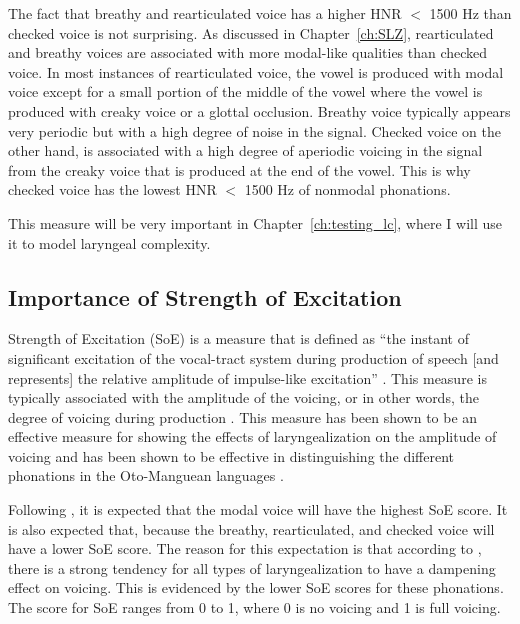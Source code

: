 The fact that breathy and rearticulated voice has a higher HNR $<$ 1500 Hz than checked voice is not surprising. As discussed in Chapter~\ref{ch:SLZ}, rearticulated and breathy voices are associated with more modal-like qualities than checked voice. In most instances of rearticulated voice, the vowel is produced with modal voice except for a small portion of the middle of the vowel where the vowel is produced with creaky voice or a glottal occlusion. Breathy voice typically appears very periodic but with a high degree of noise in the signal. Checked voice on the other hand, is associated with a high degree of aperiodic voicing in the signal from the creaky voice that is produced at the end of the vowel. This is why checked voice has the lowest HNR $<$ 1500 Hz of nonmodal phonations.

This measure will be very important in Chapter~\ref{ch:testing_lc}, where I will use it to model laryngeal complexity.

\subsection{Importance of Strength of Excitation} \label{sec:dt_soe}

Strength of Excitation (SoE) is a measure that is defined as ``the instant of significant excitation of the vocal-tract system during production of speech [and represents] the relative amplitude of impulse-like excitation'' \citep[1934]{mittalStudyEffectsVocal2014}. This measure is typically associated with the amplitude of the voicing, or in other words, the degree of voicing during production \citep{murtyEpochExtractionSpeech2008,mittalStudyEffectsVocal2014}. This measure has been shown to be an effective measure for showing the effects of laryngealization on the amplitude of voicing \citep{garellekVoicingGlottalConsonants2021} and has been shown to be effective in distinguishing the different phonations in the Oto-Manguean languages \citep{chaiPhoneticsGlottalizedPhonations2023,wellerInteractionsToneGlottalization2023,wellerLexicalToneVowel2023,wellerVoiceQualityTone2024}.

Following \citet{garellekVoicingGlottalConsonants2021}, it is expected that the modal voice will have the highest SoE score. It is also expected that, because the breathy, rearticulated, and checked voice will have a lower SoE score. The reason for this expectation is that according to \citet{garellekVoicingGlottalConsonants2021}, there is a strong tendency for all types of laryngealization to have a dampening effect on voicing. This is evidenced by the lower SoE scores for these phonations. The score for SoE ranges from 0 to 1, where 0 is no voicing and 1 is full voicing. 

